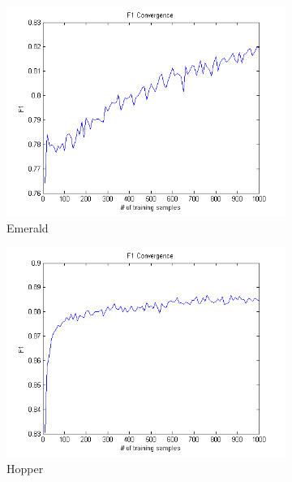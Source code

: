 \begin{figure}[t]
    \centering
        \begin{subfigure}[t]{0.33\textwidth}
            \includegraphics[width=\textwidth]{figures/F1_convergence_emerald.png}
            \caption{Emerald}
            \label{f:F1_emerald}
            \end{subfigure}
        \begin{subfigure}[t]{0.33\textwidth}
            \includegraphics[width=\textwidth]{figures/F1_convergence_hopper.png}
            \caption{Hopper}
            \label{f:F1_hopper}
        \end{subfigure}
        \begin{subfigure}[t]{0.33\textwidth}

\end{subfigure}
\end{figure}
